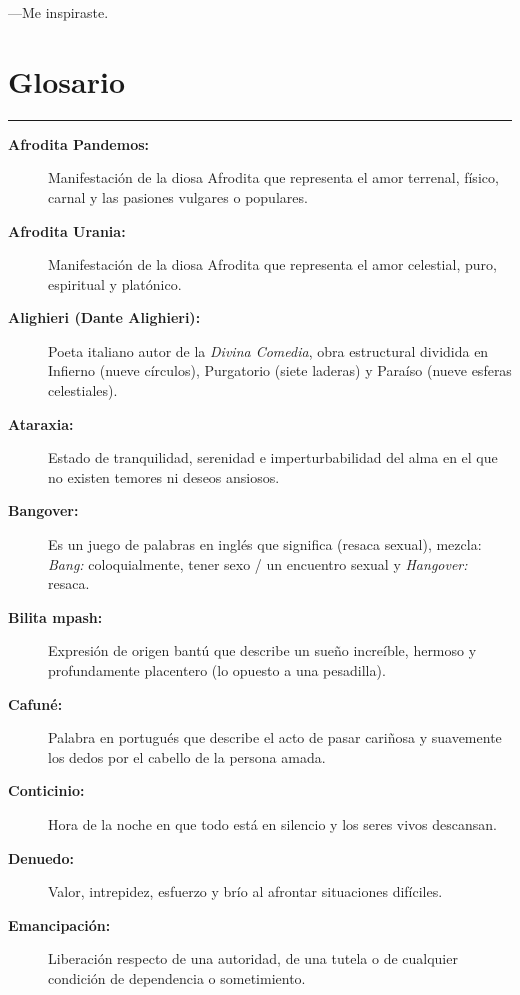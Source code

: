 \documentclass[12pt,oneside,a5paper]{book}
\begin{document}
—Me inspiraste.



\clearpage
\chapter*{Glosario}
\vspace{-0.5em}
{\color{black}\rule{\textwidth}{0.4pt}} \par \vspace{0.8em}

\begin{description}
    \item[\textbf{Afrodita Pandemos:}] Manifestación de la diosa Afrodita que representa el amor terrenal, físico, carnal y las pasiones vulgares o populares.
    \item[\textbf{Afrodita Urania:}] Manifestación de la diosa Afrodita que representa el amor celestial, puro, espiritual y platónico.
    \item[\textbf{Alighieri (Dante Alighieri):}] Poeta italiano autor de la \textit{Divina Comedia}, obra estructural dividida en Infierno (nueve círculos), Purgatorio (siete laderas) y Paraíso (nueve esferas celestiales).
    \item[\textbf{Ataraxia:}] Estado de tranquilidad, serenidad e imperturbabilidad del alma en el que no existen temores ni deseos ansiosos.
    \item[\textbf{Bangover:}] Es un juego de palabras en inglés que significa (resaca sexual), mezcla: \textit{Bang:} coloquialmente, tener sexo / un encuentro sexual y \textit{Hangover:} resaca.
    \item[\textbf{Bilita mpash:}] Expresión de origen bantú que describe un sueño increíble, hermoso y profundamente placentero (lo opuesto a una pesadilla).
    \item[\textbf{Cafuné:}] Palabra en portugués que describe el acto de pasar cariñosa y suavemente los dedos por el cabello de la persona amada.
    \item[\textbf{Conticinio:}] Hora de la noche en que todo está en silencio y los seres vivos descansan.
    \item[\textbf{Denuedo:}] Valor, intrepidez, esfuerzo y brío al afrontar situaciones difíciles.
    \item[\textbf{Emancipación:}] Liberación respecto de una autoridad, de una tutela o de cualquier condición de dependencia o sometimiento.

\end{description}
\end{document}
